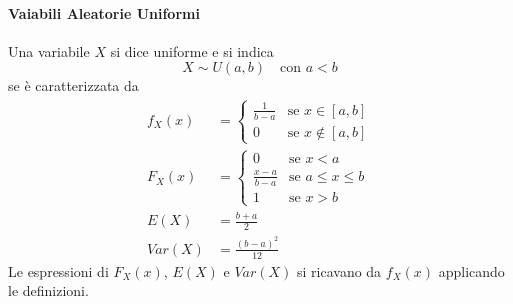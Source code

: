 \documentclass{article}
\theoremstyle{plain}
\theoremstyle{definition}
\theoremstyle{remark}
\begin{document}
\paragraph{Vaiabili Aleatorie Uniformi} %
\label{par:vaiabili_aleatorie_uniformi}
Una variabile $X$ si dice uniforme e si indica
\begin{equation*}
	X\sim U(a,b)\quad\text{con }a<b
\end{equation*}
se è caratterizzata da
\begin{align*}
	f_X(x)&=
	\begin{cases}
		\frac{1}{b-a}&\text{se }x\in[a,b]\\
		0&\text{se }x\notin[a,b]
	\end{cases}\\
	F_X(x)&=
	\begin{cases}
		0&\text{se }x<a\\
		\frac{x-a}{b-a}&\text{se }a\leq x\leq b\\
		1&\text{se }x>b
	\end{cases}\\
	E(X)&=\frac{b+a}{2}\\
	Var(X)&=\frac{(b-a)^2}{12}
\end{align*}
Le espressioni di $F_X(x)$, $E(X)$ e $Var(X)$ si ricavano da $f_X(x)$ applicando le definizioni.
\end{document}
